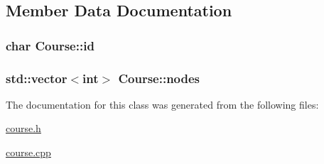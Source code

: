\subsection{\-Member \-Data \-Documentation}
\hypertarget{classCourse_ae0d417ad4feae0725245ed6a15e8ea57}{
\subsubsection[{id}]{\setlength{\rightskip}{0pt plus 5cm}char {\bf \-Course\-::id}}}\label{classCourse_ae0d417ad4feae0725245ed6a15e8ea57}
\hypertarget{classCourse_a4632a36a3759d00c6da824eafe8a50b2}{
\subsubsection[{nodes}]{\setlength{\rightskip}{0pt plus 5cm}std\-::vector$<$int$>$ {\bf \-Course\-::nodes}}}\label{classCourse_a4632a36a3759d00c6da824eafe8a50b2}


\-The documentation for this class was generated from the following files\-:\begin{DoxyCompactItemize}
\item 
\hyperlink{course_8h}{course.\-h}\item 
\hyperlink{course_8cpp}{course.\-cpp}\end{DoxyCompactItemize}
